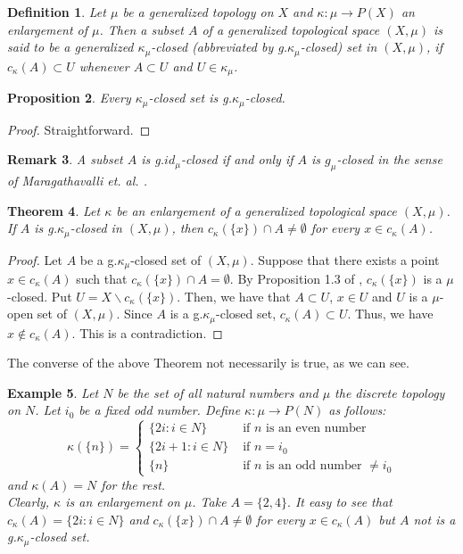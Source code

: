 \documentclass{matua}
\newtheorem{theorem}{Theorem}[section]
\newtheorem{definition}[theorem]{Definition}
\newtheorem{example}[theorem]{Example}
\newtheorem{proposition}[theorem]{Proposition}
\newtheorem{remark}[theorem]{Remark}
\begin{document}
\begin{definition}
Let $\mu$ be a generalized topology on $X$ and $\kappa: \mu\rightarrow P(X)$ an enlargement of $\mu$. Then a subset $A$ of a generalized topological space $(X, \mu)$ is said to be a generalized $\kappa_\mu$-closed (abbreviated by g.$\kappa_\mu$-closed) set in $(X, \mu)$, if $c_\kappa(A)\subset U$ whenever $A\subset U$ and $U\in\kappa_\mu$.
\end{definition}
\begin{proposition}\label{p1}
Every $\kappa_\mu$-closed set is g.$\kappa_\mu$-closed.
\end{proposition}
\begin{proof}
Straightforward.
\end{proof}
\begin{remark}
A subset $A$ is g.$id_\mu$-closed if and only if $A$ is $g_\mu$-closed in the sense of Maragathavalli et. al. \cite{R5}.
\end{remark}
\begin{theorem}
Let $\kappa$ be an enlargement of a generalized topological space $(X, \mu)$. If $A$ is g.$\kappa_\mu$-closed in $(X, \mu)$, then $c_{\kappa}(\{x\})\cap A\neq\emptyset$ for every $x\in c_{\kappa}(A)$.
\end{theorem}
\begin{proof}
Let $A$ be a g.$\kappa_\mu$-closed set of $(X, \mu)$. Suppose that there exists a point $x\in c_\kappa(A)$ such that $c_{\kappa}(\{x\}) \cap A = \emptyset$. By Proposition 1.3 of \cite{cs3}, $c_{\kappa}(\{x\})$ is a $\mu$-closed. Put $U = X\backslash c_{\kappa}(\{x\})$. Then, we have that $A\subset U$, $x\in U$ and $U$ is a $\mu$-open set of $(X, \mu)$. Since $A$ is a g.$\kappa_\mu$-closed set, $c_\kappa(A)\subset U$. Thus, we have $x\notin c_\kappa(A)$. This is a contradiction.
\end{proof}
The converse of the above Theorem not necessarily is true, as we can see.
\begin{example}\label{e2}
Let $N$ be the set of all natural numbers and $\mu$ the discrete topology on $N$. Let $i_{0}$ be a fixed odd number.
Define $\kappa: \mu\rightarrow P(N)$ as follows:
$$\kappa(\{n\}) =\left\{
\begin{array}{cc}
          \{2i:i\in N\} & \mbox{ if } n\mbox{ is an even number }\\
          \{2i+1:i\in N\} & \mbox{ if } n = i_{0}\\
          \{n\} & \mbox{ if } n \mbox{ is an odd number } \not=i_{0}
        \end{array}\right.
        $$
        and $\kappa(A)=N$ for the rest.\\
Clearly, $\kappa$ is an enlargement on $\mu$. Take $A=\{2,4\}.$ It easy to see that $c_{\kappa}(A)=\{2i:i\in N\}$ and $c_{\kappa}(\{x\})\cap A\neq\emptyset$ for every $x\in c_{\kappa}(A)$ but $A$ not is a g.$\kappa_\mu$-closed set.
\end{example}
\end{document}
